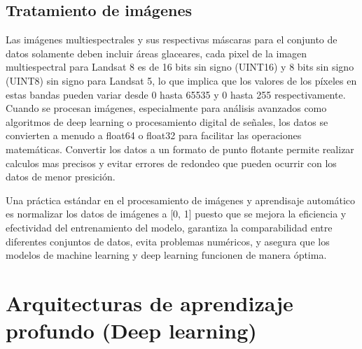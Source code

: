 
\subsection{Tratamiento de imágenes}

Las imágenes multiespectrales y sus respectivas máscaras para el conjunto de datos solamente deben incluir áreas glaceares, cada pixel de la imagen multiespectral para Landsat 8 es de 16 bits sin signo (UINT16) y 8 bits sin signo (UINT8) sin signo para Landsat 5, lo que implica que los valores de los píxeles en estas bandas pueden variar desde 0 hasta 65535 y 0 hasta 255 respectivamente. Cuando se procesan imágenes, especialmente para análisis avanzados como algoritmos de deep learning o procesamiento digital de señales, los datos se convierten a menudo a float64 o float32 para facilitar las operaciones matemáticas. Convertir los datos a un formato de punto flotante permite realizar calculos mas precisos y evitar errores de redondeo que pueden ocurrir con los datos de menor presición. 

Una práctica estándar en el procesamiento de imágenes y aprendisaje automático es normalizar los datos de imágenes a [0, 1] puesto que se mejora la eficiencia y efectividad del entrenamiento del modelo, garantiza la comparabilidad entre diferentes conjuntos de datos, evita problemas numéricos, y asegura que los modelos de machine learning y deep learning funcionen de manera óptima.

\section{Arquitecturas de aprendizaje profundo (Deep learning)}


